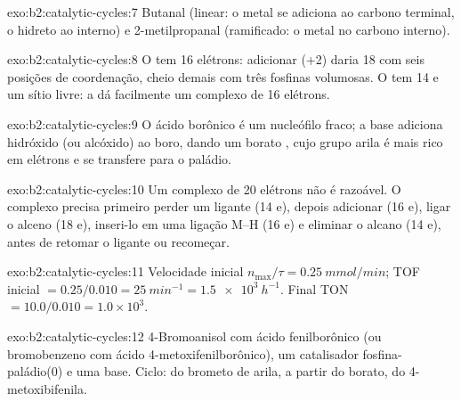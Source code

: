 \begin{solution}{exo:b2:catalytic-cycles:7}
Butanal  (linear: o metal se adiciona ao carbono terminal, o
hidreto ao interno) e 2-metilpropanal  (ramificado: o metal no
carbono interno).
\end{solution}

\begin{solution}{exo:b2:catalytic-cycles:8}
O  tem 16 elétrons: adicionar  (+2) daria 18 com seis
posições de coordenação, cheio demais com três fosfinas volumosas. O
 tem 14 e um sítio livre: a  dá facilmente
um complexo de 16 elétrons.
\end{solution}

\begin{solution}{exo:b2:catalytic-cycles:9}
O ácido borônico é um nucleófilo fraco; a base adiciona hidróxido (ou alcóxido)
ao boro, dando um borato , cujo grupo arila é mais rico em
elétrons e se transfere para o paládio.
\end{solution}

\begin{solution}{exo:b2:catalytic-cycles:10}
Um complexo de 20 elétrons não é razoável. O complexo precisa primeiro perder um
ligante (14 e), depois adicionar  (16 e), ligar o alceno (18 e),
inseri-lo em uma ligação M--H (16 e) e eliminar o alcano (14 e), antes de
retomar o ligante ou recomeçar.
\end{solution}

\begin{solution}{exo:b2:catalytic-cycles:11}
Velocidade inicial $n_{\max}/\tau = \qty{0.25}{mmol/min}$; TOF inicial $= 0.25/0.010 =
\qty{25}{min^{-1}} = \qty{1.5e3}{h^{-1}}$. Final TON $= 10.0/0.010 = 1.0 \times 10^3$.
\end{solution}

\begin{solution}{exo:b2:catalytic-cycles:12}
4-Bromoanisol com ácido fenilborônico (ou bromobenzeno com ácido
4-metoxifenilborônico), um catalisador fosfina-paládio(0) e uma base. Ciclo:
 do brometo de arila,  a partir do borato,
 do 4-metoxibifenila.
\end{solution}

